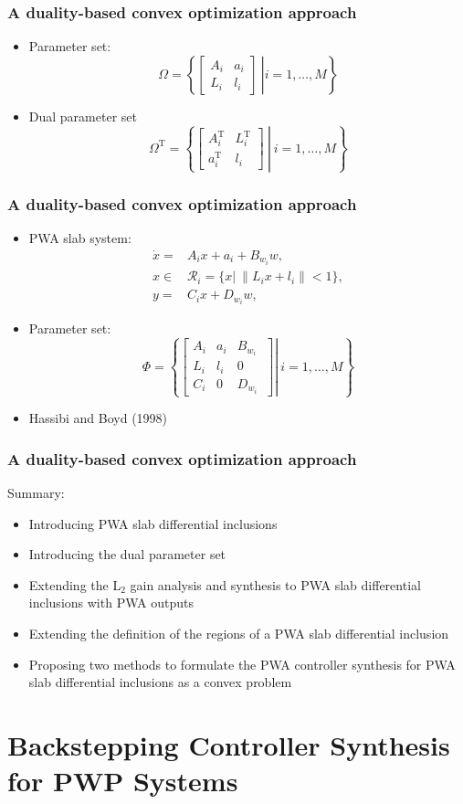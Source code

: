 \documentclass{beamer}
\newcommand{\TR}{\text{T}}
\newcommand{\beq}{\begin{equation*}}
\newcommand{\eeq}{\end{equation*}}
\newcommand{\bmat}{\left[\begin{array}}
\newcommand{\emat}{\end{array}\right]}
\begin{document}
  \frame
  {
    \frametitle{A duality-based convex optimization approach}
    \begin{itemize}
    \item Parameter set:
\beq
\Omega =\left\{ \left.\bmat{cc}A_{i}&a_{i}\\L_i&l_i\emat\ \right| i=1,\ldots,M \right\}
\eeq
\item Dual parameter set
\beq
\Omega^\TR =\left\{ \left.\bmat{cc}A_{i}^\TR&L_i^\TR\\a_{i}^\TR&l_i\emat\ \right|\ i=1,\ldots,M\right\}
\eeq
\end{itemize}
}

\frame
  {
    \frametitle{A duality-based convex optimization approach}
    \begin{itemize}
    \item PWA slab system:
\begin{align}
\dot x =& A_{i}x+a_{i}+B_{w_{i}}w, \nonumber\\
x\in&{\mathcal R}_i=\{x |\ \|L_ix+l_i\|<1\}, \nonumber\\
y =& C_{i}x+D_{w_{i}}w, \nonumber
\end{align}
\item Parameter set:
\beq
\Phi =\left\{ \left.\bmat{ccc}A_{i}&a_{i}&B_{w_{i}}\\
L_i&l_i&0\\C_{i}&0&D_{w_{i}}\ \emat\right|\ i=1,\ldots,M \right\}
\eeq
\item {Hassibi and Boyd (1998)}
\end{itemize}
 }

\frame
  {
    \frametitle{A duality-based convex optimization approach}
    Summary:
    \begin{itemize}
    \item Introducing PWA slab differential inclusions
    \item Introducing the dual parameter set
    \item Extending the L$_2$ gain analysis and synthesis to PWA slab differential inclusions with PWA outputs
    \item Extending the definition of the regions of a PWA slab differential inclusion
    \item Proposing two methods to formulate the PWA controller synthesis for PWA slab differential inclusions as a convex problem
    \end{itemize}
}  

  \section[]{Backstepping Controller Synthesis for PWP Systems}
\end{document}
